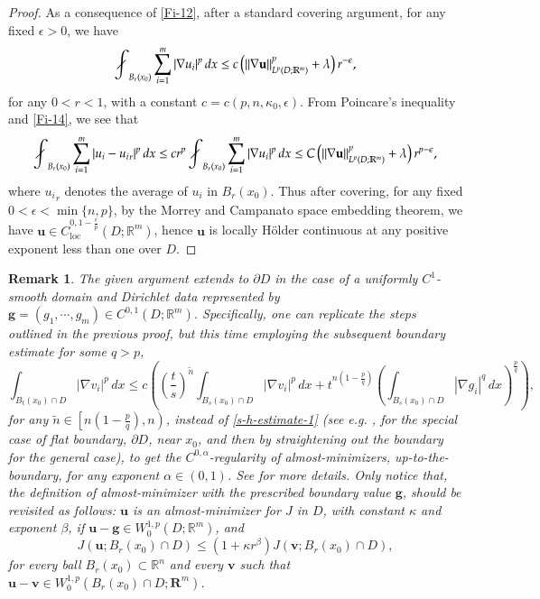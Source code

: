 \documentclass{amsart}
\newtheorem{remark}[theorem]{Remark}
\def\avint{\mathop{\,\rlap{$\diagup$}\!\!\int}\nolimits}
\begin{document}
\begin{proof}
As a consequence of \eqref{Fi-12}, after a standard covering argument, for any fixed $\epsilon > 0$, we have 
\begin{equation}
\label{Fi-14}
\avint_{B_{r}(x_0)} \sum_{i=1}^{m} |\nabla u_i|^p \, dx \le  c \left(\|\nabla \mathbf{u}\|_{L^{p}(D; \mathbb{R}^m)}^p+\lambda \right) r^{-\epsilon},
\end{equation}
for any $0<r<1$, with a constant $c=c(p, n, \kappa_0, \epsilon)$.
From  Poincare's inequality and \eqref{Fi-14}, we see that
$$ 
\avint_{B_{r}(x_0)} \sum_{i=1}^{m} |u_i-{u_i}_{r}|^p \, dx \leq c r^p \avint_{B_{r}(x_0)} \sum_{i=1}^{m} |\nabla u_i|^p \, dx \leq C \left(\|\nabla \mathbf{u}\|_{L^{p}(D; \mathbb{R}^m)}^p +\lambda \right) r^{p-\epsilon},
$$
where ${u_i}_{r}$ denotes the average of $u_i$ in $B_{r}(x_0)$. Thus after covering, for any fixed $0<\epsilon <\min\{n,p\}$, 
by the Morrey and Campanato space embedding theorem, we have $ \mathbf{u} \in C_{\mathrm{loc}}^{0,1-\frac{\epsilon}{p}}(D; \mathbb{R}^m)$, hence $\mathbf{u}$ is locally H\"older continuous at any positive exponent less than one over $D$. 
\end{proof}




\begin{remark}\label{Remark-e-01}
 The given argument extends to $\partial D$ in the case of a uniformly $C^1$-smooth domain and Dirichlet data represented by $\mathbf{g}=(g_1, \cdots, g_m) \in C^{0,1}(D;\mathbb{R}^m)$. Specifically, one can replicate the steps outlined in the previous proof, but this time employing the subsequent boundary estimate for some $q>p$,
$$
\int_{B_t(x_0) \cap D}  |\nabla v_i|^p \, dx \leq c \left( \left(\frac{t}{s} \right)^{\tilde{n}}\int_{B_s(x_0) \cap D} |\nabla v_i |^p \, dx + t^{n\left(1-\frac{p}{q}\right)} \left(\int_{B_s(x_0) \cap D} |\nabla g_i|^q \, dx  \right)^{\frac{p}{q}} \right),
$$ 
for any $\tilde{n} \in \left[n\left(1-\frac{p}{q}\right),n\right) $, instead of \eqref{s-h-estimate-1} (see e.g. 
\cite[Lemma 3.4]{duzaar2004partial}, for the special case of flat boundary, $\partial D$, near $x_0$, and then by straightening out the 
boundary for the general case), to get the $C^{0,\alpha}$-regularity of almost-minimizers, up-to-the-boundary, for any exponent $\alpha \in (0,1)$. See \cite[Theorem 5.4]{duzaar2004partial} for more details.
Only notice that, the definition of almost-minimizer with the prescribed boundary value $\mathbf{g}$, should be revisited as follows: $\mathbf{u}$ is an almost-minimizer for $J$ in $D$, with  constant $\kappa$ and exponent $\beta$, if $\mathbf{u}-\mathbf{g} \in W_0^{1,p}(D; \mathbb{R}^m)$, and 
$$
J(\mathbf{u}; B_r(x_0) \cap D) \leq \left(1+\kappa r^{\beta} \right) J(\mathbf{v}; B_r(x_0) \cap D), 
$$
for every ball $B_r(x_0) \subset \mathbb{R}^n$ and every $\mathbf{v}$ such that $\mathbf{u}-\mathbf{v} \in W^{1,p}_0(B_r(x_0) \cap D; \mathbf{R}^m)$.
\end{remark}
\end{document}
